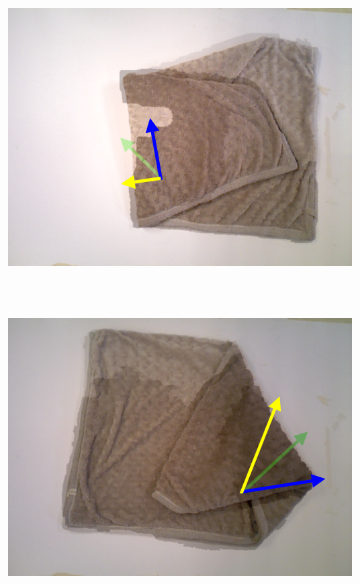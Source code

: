 \begin{figure}[htbp]
\begin{subfigure}[l]{0.49\textwidth}
    	\includegraphics[width=\textwidth]
    	{figures/directions-03.pdf}
    	\vspace{-10px}
	\end{subfigure}
	~
    \begin{subfigure}[r]{0.49\textwidth}
	    \centering
    	\includegraphics[width=\textwidth]
    	{figures/directions-04.pdf}
    	\vspace{-10px}
	\end{subfigure}
	~
	\begin{subfigure}[l]{0.49\textwidth}
	    \centering

\end{subfigure}
\end{figure}

